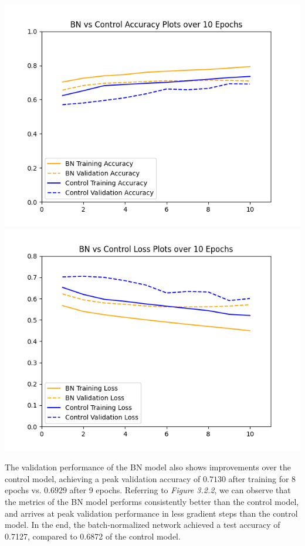 \documentclass{article}
\newenvironment{Figure}
  {\par\medskip\noindent\minipage{\linewidth}}
  {\endminipage\par\medskip}
\begin{document}
\begin{multicols}{2}
\begin{Figure}
    \captionsetup{labelformat=empty}
    \includegraphics[width=\linewidth]{AccHist.png}
    \includegraphics[width=\linewidth]{LossHist.png}
\end{Figure}

The validation performance of the BN model also shows improvements over the 
control model, achieving a peak validation accuracy of $0.7130$ after training
for 8 epochs vs. $0.6929$ after 9 epochs. Referring to \textit{Figure 3.2.2}, 
we can observe that the metrics of the BN model performs consistently better 
than the control model, and arrives at peak validation performance in less
gradient steps than the control model. In the end, the batch-normalized network 
achieved a test accuracy of 0.7127, compared to 0.6872 of the control model.



\end{multicols}
\end{document}
